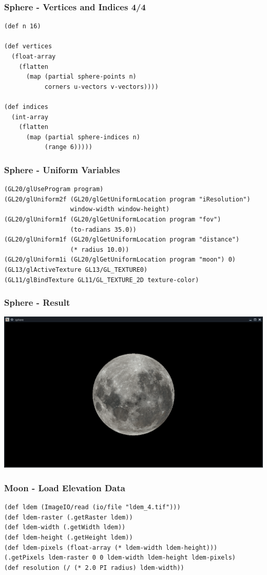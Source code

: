 \documentclass[aspectratio=169,11pt,xcolor=dvipsnames]{beamer}
\begin{document}
\begin{frame}[fragile]
  \frametitle{Sphere {-} Vertices and Indices 4/4}
  \begin{verbatim}
(def n 16)

(def vertices
  (float-array
    (flatten
      (map (partial sphere-points n)
           corners u-vectors v-vectors))))

(def indices
  (int-array
    (flatten
      (map (partial sphere-indices n)
           (range 6)))))
  \end{verbatim}
\end{frame}

\begin{frame}[fragile]
  \frametitle{Sphere {-} Uniform Variables}
  \begin{verbatim}
(GL20/glUseProgram program)
(GL20/glUniform2f (GL20/glGetUniformLocation program "iResolution")
                  window-width window-height)
(GL20/glUniform1f (GL20/glGetUniformLocation program "fov")
                  (to-radians 35.0))
(GL20/glUniform1f (GL20/glGetUniformLocation program "distance")
                  (* radius 10.0))
(GL20/glUniform1i (GL20/glGetUniformLocation program "moon") 0)
(GL13/glActiveTexture GL13/GL_TEXTURE0)
(GL11/glBindTexture GL11/GL_TEXTURE_2D texture-color)
  \end{verbatim}
\end{frame}

\begin{frame}
  \frametitle{Sphere {-} Result}
  \begin{center}
    \includegraphics[width=.8\textwidth]{sphere}
  \end{center}
\end{frame}

\begin{frame}[fragile]
  \frametitle{Moon {-} Load Elevation Data}
  \begin{verbatim}
(def ldem (ImageIO/read (io/file "ldem_4.tif")))
(def ldem-raster (.getRaster ldem))
(def ldem-width (.getWidth ldem))
(def ldem-height (.getHeight ldem))
(def ldem-pixels (float-array (* ldem-width ldem-height)))
(.getPixels ldem-raster 0 0 ldem-width ldem-height ldem-pixels)
(def resolution (/ (* 2.0 PI radius) ldem-width))
  \end{verbatim}
\end{frame}
\end{document}
